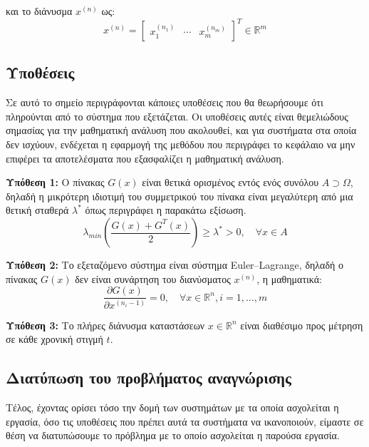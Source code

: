 και το διάνυσμα $x^{(n)}$ ως:
\begin{equation*}
	x^{(n)} = \begin{bmatrix} x_1^{(n_1)} & \cdots & x_m^{(n_m)} \end{bmatrix}^T
	\in \mathbb{R}^m
\end{equation*}

\subsection{Υποθέσεις} \label{assumptions}
Σε αυτό το σημείο περιγράφονται κάποιες υποθέσεις που θα θεωρήσουμε ότι πληρούνται από το σύστημα που εξετάζεται. Οι υποθέσεις αυτές είναι θεμελιώδους σημασίας για την μαθηματική ανάλυση που ακολουθεί, και για συστήματα στα οποία δεν ισχύουν, ενδέχεται η εφαρμογή της μεθόδου που περιγράφει το κεφάλαιο να μην επιφέρει τα αποτελέσματα που εξασφαλίζει η μαθηματική ανάλυση.

\textbf{Υπόθεση 1:} Ο πίνακας $G(x)$ είναι θετικά ορισμένος εντός ενός συνόλου $A \supset \Omega$, δηλαδή η μικρότερη ιδιοτιμή του συμμετρικού του πίνακα είναι μεγαλύτερη από μια θετική σταθερά $\lambda^*$ όπως περιγράφει η παρακάτω εξίσωση.
\begin{equation}
	\lambda_{min} \left(\frac{G(x) + G^T (x)}{2}\right) \geq \lambda^* > 0
	,\quad \forall x \in A
	\label{eq:assump_1}
\end{equation}

\textbf{Υπόθεση 2:} Το εξεταζόμενο σύστημα είναι σύστημα Euler–Lagrange, δηλαδή ο πίνακας $G(x)$ δεν είναι συνάρτηση του διανύσματος $x^{(n)}$, η μαθηματικά:
\begin{equation}
	\frac{\partial G(x)}{\partial x^{(n_i-1)}} = 0, \quad \forall x \in \mathbb{R}^n, i = 1,\dots,m
	\label{eq:assump_2}
\end{equation}

\textbf{Υπόθεση 3:} Το πλήρες διάνυσμα καταστάσεων $x \in \mathbb{R}^n$ είναι διαθέσιμο προς μέτρηση σε κάθε χρονική στιγμή $t$.

\subsection{Διατύπωση του προβλήματος αναγνώρισης} \label{subsec:problem_definition}
Τέλος, έχοντας ορίσει τόσο την δομή των συστημάτων με τα οποία ασχολείται η εργασία, όσο τις υποθέσεις που πρέπει αυτά τα συστήματα να ικανοποιούν, είμαστε σε θέση να διατυπώσουμε το πρόβλημα με το οποίο ασχολείται η παρούσα εργασία.

